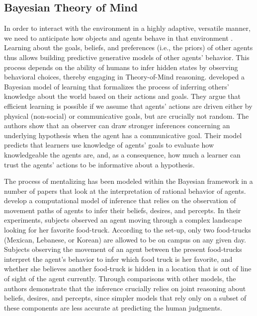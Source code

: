 \documentclass[11pt,a4paper]{article}
\begin{document}
\subsection{Bayesian Theory of Mind} \label{inferring}

In order to interact with the environment in a highly adaptive, versatile manner, we need to anticipate how objects and agents behave in that environment \cite{Butz:2016}. Learning about the goals, beliefs, and preferences (i.e., the priors) of other agents thus allows building predictive generative models of other agents' behavior. This process depends on the ability of humans to infer hidden states by observing behavioral choices, thereby engaging in Theory-of-Mind reasoning.  developed a Bayesian model of learning that formalizes the process of inferring others' knowledge about the world based on their actions and goals. They argue that efficient learning is possible if we assume that agents' actions are driven either by physical (non-social) or communicative goals, but are crucially not random. The authors show that an observer can draw stronger inferences concerning an underlying hypothesis when the agent has a communicative goal. Their model predicts that learners use knowledge of agents' goals to evaluate how knowledgeable the agents are, and, as a consequence, how much a learner can trust the agents' actions to be informative about a hypothesis.

The process of mentalizing has been modeled within the Bayesian framework in a number of papers that look at the interpretation of rational behavior of agents.  develop  a computational model of inference that relies on the observation of movement paths of agents to infer their beliefs, desires, and percepts. In their experiments, subjects observed an agent moving through a complex landscape looking for her favorite food-truck. According to the set-up, only two food-trucks (Mexican, Lebanese, or Korean) are allowed to be on campus on any given day. Subjects observing the movement of an agent between the present food-trucks interpret the agent's behavior to infer which food truck is her favorite, and whether she believes another food-truck is hidden in a location that is out of line of sight of the agent currently. Through comparisons with other models, the authors demonstrate that the inference crucially relies on joint reasoning about beliefs, desires, and percepts, since simpler models that rely only on a subset of these components are less accurate at predicting the human judgments.
\end{document}
